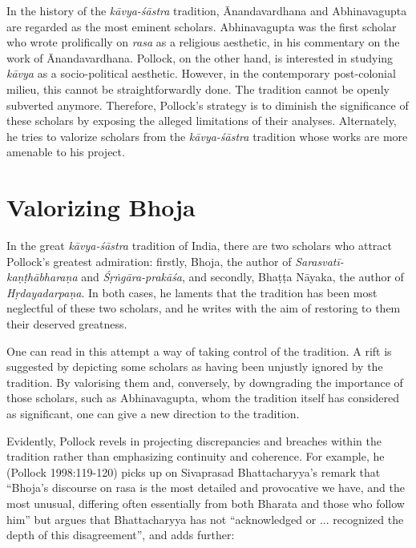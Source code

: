 In the history of the \textsl{kāvya-śāstra} tradition, Ānandavardhana and Abhinavagupta are regarded as the most eminent scholars. Abhinavagupta was the first scholar who wrote prolifically on \textsl{rasa} as a religious aesthetic, in his commentary on the work of Ānandavardhana. Pollock, on the other hand, is interested in studying \textsl{kāvya} as a socio-political aesthetic. However, in the contemporary post-colonial milieu, this cannot be straightforwardly done. The tradition cannot be openly subverted anymore. Therefore, Pollock's strategy is to diminish the significance of these scholars by exposing the alleged limitations of their analyses. Alternately, he tries to valorize scholars from the \textsl{kāvya-śāstra} tradition whose works are more amenable to his project.
\smallskip

\section*{Valorizing Bhoja}

In the great \textsl{kāvya-śāstra} tradition of India, there are two scholars who attract Pollock's greatest admiration: firstly, Bhoja, the author of \textsl{Sarasvatī-kaṇṭhābharaṇa} and \textsl{Śṛṅgāra-prakāśa}, and secondly, Bhaṭṭa Nāyaka, the author of \textsl{Hṛdayadarpaṇa}. In both cases, he laments that the tradition has been most neglectful of these two scholars, and he writes with the aim of restoring to them their deserved greatness. 

One can read in this attempt a way of taking control of the tradition. A rift is suggested by depicting some scholars as having been unjustly ignored by the tradition. By valorising them and, conversely, by downgrading the importance of those scholars, such as Abhinavagupta, whom the tradition itself has considered as significant, one can give a new direction to the tradition.

Evidently, Pollock revels in projecting discrepancies and breaches with\-in the tradition rather than emphasizing continuity and coherence. For example, he (Pollock 1998:119-120) picks up on Sivaprasad Bhattacharyya's remark that ``Bhoja's discourse on rasa is the most detailed and provocative we have, and the most unusual, differing often essentially from both Bharata and those who follow him'' but argues that Bhattacharyya has not ``acknowledged or ... recognized the depth of this disagreement'', and adds further:


